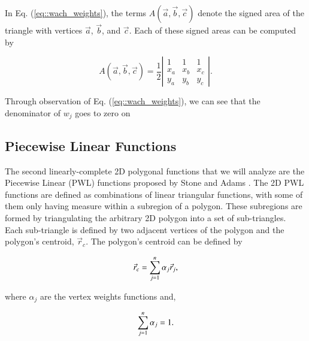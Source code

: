 \documentclass[preprint,10pt]{elsarticle}
\begin{document}
\noindent In Eq. (\ref{eq::wach_weights}), the terms $A(\vec{a}, \vec{b}, \vec{c})$ denote the signed area of the triangle with vertices $\vec{a}$, $\vec{b}$, and $\vec{c}$. Each of these signed areas can be computed by

\begin{equation}
\label{eq::wach_signed_area}
A(\vec{a}, \vec{b}, \vec{c}) = \frac{1}{2}
\left|  
  \begin{array}{ccc}
  1 & 1 & 1 \\
  x_a & x_b & x_c \\
  y_a & y_b & y_c
  \end{array}
\right| .
\end{equation}

\noindent Through observation of Eq. (\ref{eq::wach_weights}), we can see that the denominator of $w_j$ goes to zero on 

\subsection{Piecewise Linear Functions}

The second linearly-complete 2D polygonal functions that we will analyze are the Piecewise Linear (PWL) functions proposed by Stone and Adams \cite{ref::PWLD_stone_adams,ref::PWLD_stone_adams_unstructured}. The 2D PWL functions are defined as combinations of linear triangular functions, with some of them only having measure within a subregion of a polygon. These subregions are formed by triangulating the arbitrary 2D polygon into a set of sub-triangles.  Each sub-triangle is defined by two adjacent vertices of the polygon and the polygon's centroid, $\vec{r}_{c}$. The polygon's centroid can be defined by

\begin{equation}
\label{eq::PWL_2D_centroid}
	\vec{r}_{c} =  \sum\displaylimits_{j=1}^{n} \alpha_{j} \vec{r}_j ,
\end{equation}

\noindent where $\alpha_{j}$ are the vertex weights functions and, 

\begin{equation}
\label{eq::PWL_2D_vertex_weight_sum}
 \sum\displaylimits_{j=1}^{n} \alpha_{j} = 1.
\end{equation}
\end{document}
